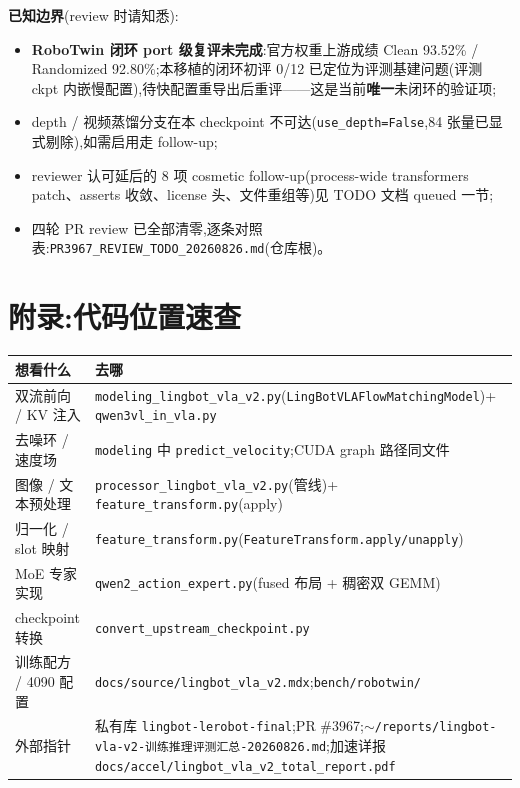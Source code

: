 \documentclass[11pt]{ctexart}
\begin{document}
\textbf{已知边界}(review 时请知悉):
\begin{itemize}[nosep,leftmargin=1.4em]
  \item \textbf{RoboTwin 闭环 port 级复评未完成}:官方权重上游成绩 Clean 93.52\% / Randomized 92.80\%;本移植的闭环初评 0/12 已定位为评测基建问题(评测 ckpt 内嵌慢配置),待快配置重导出后重评——这是当前\textbf{唯一}未闭环的验证项;
  \item depth / 视频蒸馏分支在本 checkpoint 不可达(\texttt{use\_depth=False},84 张量已显式剔除),如需启用走 follow-up;
  \item reviewer 认可延后的 8 项 cosmetic follow-up(process-wide transformers patch、asserts 收敛、license 头、文件重组等)见 TODO 文档 queued 一节;
  \item 四轮 PR review 已全部清零,逐条对照表:\texttt{PR3967\_REVIEW\_TODO\_20260826.md}(仓库根)。
\end{itemize}

\section*{附录:代码位置速查}
\begin{table}[htbp]\centering\small
\begin{tabular}{@{}p{4.6cm}p{9.4cm}@{}}
\toprule
\textbf{想看什么} & \textbf{去哪} \\
\midrule
双流前向 / KV 注入 & \texttt{modeling\_lingbot\_vla\_v2.py}(\texttt{LingBotVLAFlowMatchingModel})+ \texttt{qwen3vl\_in\_vla.py} \\
去噪环 / 速度场 & \texttt{modeling} 中 \texttt{predict\_velocity};CUDA graph 路径同文件 \\
图像 / 文本预处理 & \texttt{processor\_lingbot\_vla\_v2.py}(管线)+ \texttt{feature\_transform.py}(apply) \\
归一化 / slot 映射 & \texttt{feature\_transform.py}(\texttt{FeatureTransform.apply/unapply}) \\
MoE 专家实现 & \texttt{qwen2\_action\_expert.py}(fused 布局 + 稠密双 GEMM) \\
checkpoint 转换 & \texttt{convert\_upstream\_checkpoint.py} \\
训练配方 / 4090 配置 & \texttt{docs/source/lingbot\_vla\_v2.mdx};\texttt{bench/robotwin/} \\
\midrule
外部指针 & 私有库 \texttt{lingbot-lerobot-final};PR \#3967;\texttt{$\sim$/reports/lingbot-vla-v2-训练推理评测汇总-20260826.md};加速详报 \texttt{docs/accel/lingbot\_vla\_v2\_total\_report.pdf} \\
\bottomrule
\end{tabular}
\end{table}
\end{document}

